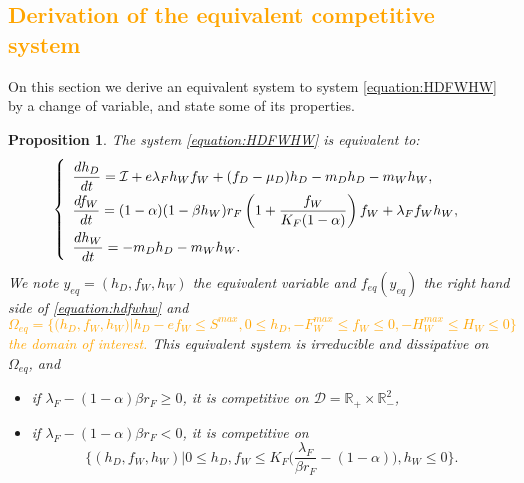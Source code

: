 \documentclass{article}
\newcommand{\lfw}{\lambda_{F}}
\newcommand{\lfw}{\lambda_{F}}
\newcommand{\cI}{\mathcal{I}}
\newcommand{\R}{\mathbb{R}}
\newcommand{\vdeux}[1]{\textcolor{orange}{#1}}
\newtheorem{prop}[theorem]{Proposition}
\theoremstyle{definition}
\theoremstyle{remark}
\begin{document}
\subsection{\vdeux{Derivation of the equivalent competitive system}}
On this section we derive an equivalent system to system \eqref{equation:HDFWHW} by a change of variable, and state some of its properties.  
\begin{prop} \label{prop: equivalentSystem}
The system \eqref{equation:HDFWHW} is equivalent to:
\begin{equation}
\def\arraystretch{2}
\left\{ \begin{array}{l}
\dfrac{dh_D}{dt}= \cI + e\lfw h_W f_W + (f_D - \mu_D) h_D - m_D h_D - m_W h_W, \\
\dfrac{df_W}{dt} = (1-\alpha)(1 - \beta h_W) r_F \left(1 + \dfrac{f_W}{K_F(1-\alpha)} \right) f_W + \lfw f_W h_W, \\
\dfrac{dh_W}{dt}= -m_D h_D - m_W h_W. 
\end{array} \right.
\label{equation:hdfwhw}
\end{equation}
We note $y_{eq} = (h_D, f_W, h_W)$ the equivalent variable and $f_{eq}(y_{eq})$ the right hand side of \eqref{equation:hdfwhw} and \vdeux{
$$
\Omega_{eq} = \Big\{\Big(h_D, f_W, h_W \Big)  \Big|h_D - ef_W \leq S^{max}, 0 \leq h_D,  -F_W^{max} \leq f_W \leq 0, -H_W^{max} \leq H_W \leq 0 \Big\}
$$ the domain of interest. }
This equivalent system is irreducible and dissipative on $\Omega_{eq}$, and
\begin{itemize}
\item if $\lfw - (1-\alpha)\beta r_F \geq 0$, it is competitive on $\mathcal{D} = \R_+ \times \R_-^2$,
\item if $\lfw - (1-\alpha)\beta r_F < 0$, it is competitive on $$\Big\{(h_D, f_W, h_W) | 0 \leq h_D, f_W \leq K_F\big(\dfrac{\lfw}{\beta r_F}-(1-\alpha)\big), h_W \leq 0 \Big\}.$$ 
\end{itemize}

\end{prop}
\end{document}

